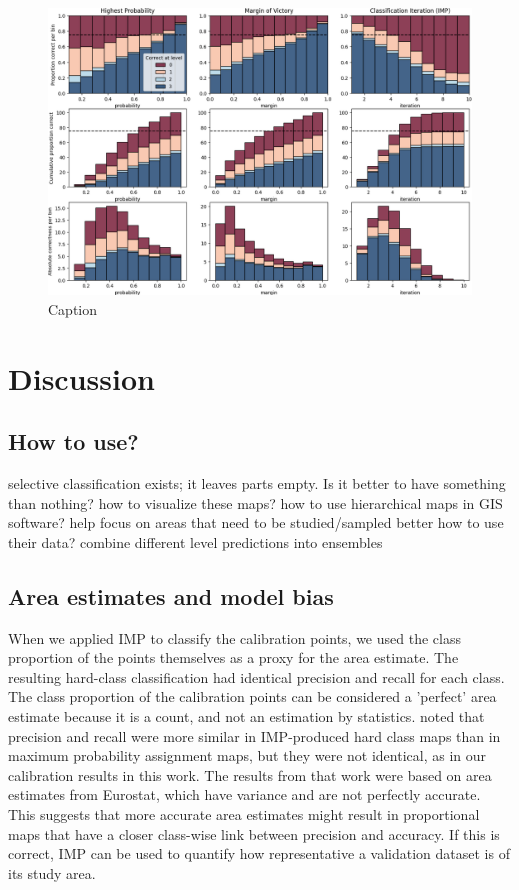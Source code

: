         \begin{figure}[H]
            \centering
            \includegraphics[width=\linewidth]{figs_05/fig_calibration.png}
            \caption{Caption}
            \label{fig:05_comparison_metrics}
        \end{figure}

\section{Discussion}

    \subsection{How to use?}
        selective classification exists; it leaves parts empty. Is it better to have something than nothing?
        how to visualize these maps?
        how to use hierarchical maps in GIS software?
            help focus on areas that need to be studied/sampled better
        how to use their data?
            combine different level predictions into ensembles
        
        

    \subsection{Area estimates and model bias}

        When we applied IMP to classify the calibration points, we used the class proportion of the points themselves as a proxy for the area estimate. The resulting hard-class classification had identical precision and recall for each class. The class proportion of the calibration points can be considered a 'perfect' area estimate because it is a count, and not an estimation by statistics. \citet{witjes2024iterative} noted that precision and recall were more similar in IMP-produced hard class maps than in maximum probability assignment maps, but they were not identical, as in our calibration results in this work. The results from that work were based on area estimates from Eurostat, which have variance and are not perfectly accurate. This suggests that more accurate area estimates might result in proportional maps that have a closer class-wise link between precision and accuracy. If this is correct, IMP can be used to quantify how representative a validation dataset is of its study area.
        
